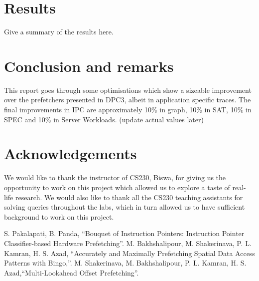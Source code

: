 \documentclass[conference]{IEEEtran}
\begin{document}

\section{Results}
Give a summary of the results here.

\section*{Conclusion and remarks}
This report goes through some optimisations which show a sizeable improvement over the prefetchers presented in DPC3, albeit in application specific traces. The final improvements in IPC are approximately 10\% in graph, 10\% in SAT, 10\% in SPEC and 10\% in Server Workloads. (update actual values later)

\section*{Acknowledgements}
We would like to thank the instructor of CS230, Biswa, for giving us the opportunity to work on this project which allowed us to explore a taste of real-life research. We would also like to thank all the CS230 teaching assistants for solving queries throughout the labs, which in turn allowed us to have sufficient background to work on this project. 

\begin{thebibliography}{00}
 S. Pakalapati, B. Panda, ``Bouquet of Instruction Pointers: Instruction Pointer Classifier-based Hardware Prefetching''.
 M. Bakhshalipour, M. Shakerinava, P. L. Kamran, H. S. Azad, ``Accurately and Maximally Prefetching Spatial Data Access Patterns with Bingo,''.
M. Shakerinava, M. Bakhshalipour, P. L. Kamran, H. S. Azad,``Multi-Lookahead Offset Prefetching''.
\end{thebibliography}
\vspace{12pt}
\end{document}
